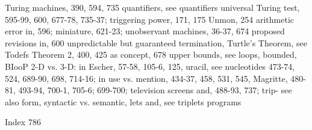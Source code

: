 Turing machines, 390, 594, 735                 quantifiers, see quantifiers universal
Turing test, 595-99, 600, 677-78, 735-37;      triggering power, 171, 175 Unmon, 254
arithmetic error in, 596; miniature, 621-23;   unobservant machines, 36-37, 674
proposed revisions in, 600                     unpredictable but guaranteed termination,
Turtle's Theorem, see Todefs Theorem 2,        400, 425
as concept, 678                                upper bounds, see loops, bounded, BIooP
2-D vs. 3-D: in Escher, 57-58, 105-6, 125,     uracil, see nucleotides
473-74, 524, 689-90, 698, 714-16; in           use vs. mention, 434-37, 458, 531, 545,
Magritte, 480-81, 493-94, 700-1, 705-6;        699-700;
television screens and, 488-93, 737; trip-     see also form, syntactic vs. semantic,
lets and, see triplets                         programs



Index                                                                                 786

